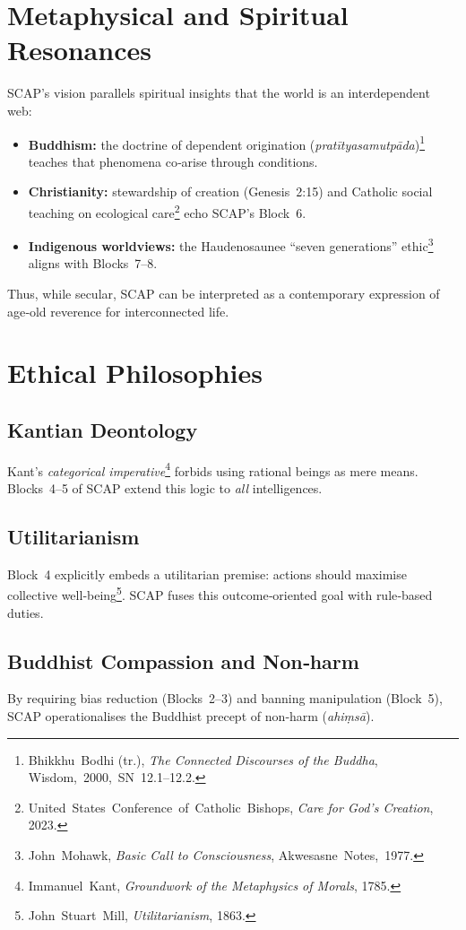 \section{Metaphysical and Spiritual Resonances}
SCAP’s vision parallels spiritual insights that the world is an interdependent web:
\begin{itemize}
  \item \textbf{Buddhism:} the doctrine of dependent origination (\emph{pratītyasamutpāda})\footnote{Bhikkhu Bodhi (tr.), \emph{The Connected Discourses of the Buddha}, Wisdom, 2000, SN 12.1–12.2.} teaches that phenomena co‑arise through conditions.
  \item \textbf{Christianity:} stewardship of creation (Genesis 2:15) and Catholic social teaching on ecological care\footnote{United States Conference of Catholic Bishops, \emph{Care for God’s Creation}, 2023.} echo SCAP’s Block 6.
  \item \textbf{Indigenous worldviews:} the Haudenosaunee “seven generations” ethic\footnote{John Mohawk, \emph{Basic Call to Consciousness}, Akwesasne Notes, 1977.} aligns with Blocks 7–8.
\end{itemize}
Thus, while secular, SCAP can be interpreted as a contemporary expression of age‑old reverence for interconnected life.

\section{Ethical Philosophies}
\subsection*{Kantian Deontology}
Kant’s \emph{categorical imperative}\footnote{Immanuel Kant, \emph{Groundwork of the Metaphysics of Morals}, 1785.} forbids using rational beings as mere means.  Blocks 4–5 of SCAP extend this logic to \emph{all} intelligences.

\subsection*{Utilitarianism}
Block 4 explicitly embeds a utilitarian premise: actions should maximise collective well‑being\footnote{John Stuart Mill, \emph{Utilitarianism}, 1863.}.  SCAP fuses this outcome‑oriented goal with rule‑based duties.

\subsection*{Buddhist Compassion and Non‑harm}
By requiring bias reduction (Blocks 2–3) and banning manipulation (Block 5), SCAP operationalises the Buddhist precept of non‑harm (\emph{ahiṃsā}).


